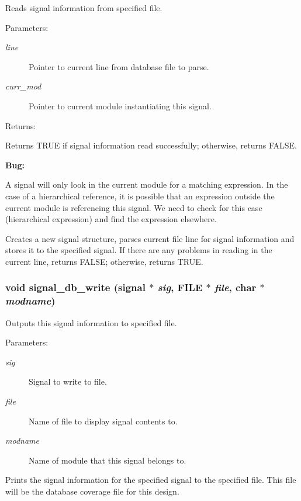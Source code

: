 Reads signal information from specified file.

\begin{Desc}
\item[Parameters: ]\par
\begin{description}
\item[{\em 
line}]Pointer to current line from database file to parse. \item[{\em 
curr\_\-mod}]Pointer to current module instantiating this signal.\end{description}
\end{Desc}
\begin{Desc}
\item[Returns: ]\par
Returns TRUE if signal information read successfully; otherwise, returns FALSE.\end{Desc}


\begin{Desc}
\item[{\bf Bug: }]\par
A signal will only look in the current module for a matching expression. In the case of a hierarchical reference, it is possible that an expression outside the current module is referencing this signal. We need to check for this case (hierarchical expression) and find the expression elsewhere.\end{Desc}


Creates a new signal structure, parses current file line for signal information and stores it to the specified signal. If there are any problems in reading in the current line, returns FALSE; otherwise, returns TRUE. 
\subsubsection{\setlength{\rightskip}{0pt plus 5cm}void signal\_\-db\_\-write ({\bf signal} $\ast$ {\em sig}, FILE $\ast$ {\em file}, char $\ast$ {\em modname})}\label{signal_8c_a3}


Outputs this signal information to specified file.

\begin{Desc}
\item[Parameters: ]\par
\begin{description}
\item[{\em 
sig}]Signal to write to file. \item[{\em 
file}]Name of file to display signal contents to. \item[{\em 
modname}]Name of module that this signal belongs to.\end{description}
\end{Desc}
Prints the signal information for the specified signal to the specified file. This file will be the database coverage file for this design. 
